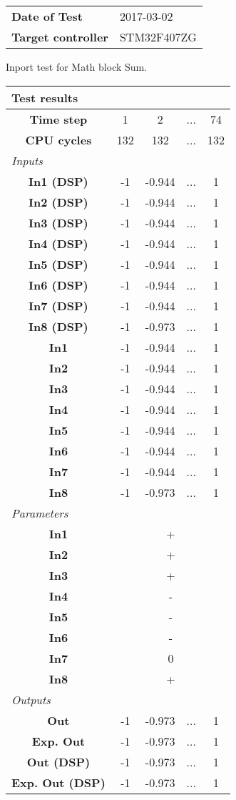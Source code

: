\begin{tabular}{l l}
\textbf{Date of Test} & 2017-03-02 \tabularnewline
\textbf{Target controller} & STM32F407ZG \tabularnewline
\end{tabular}
\vspace{1ex}
Inport test for Math block Sum.

\vspace{1em}
\begin{tabularx}{\textwidth}{|c|c|c|>{\centering\arraybackslash}X|c|}
\hline
\multicolumn{5}{|l|}{\cellcolor[gray]{0.8}\textbf{Test results}} \tabularnewline \hline
\textbf{Time step} & 1 & 2 & ... & 74 \tabularnewline \hline
\textbf{CPU cycles} & 132 & 132 & ... & 132 \tabularnewline \hline
\multicolumn{5}{|l|}{\cellcolor[gray]{0.9}\textit{Inputs}} \tabularnewline \hline
\textbf{In1 (DSP)} & -1 & -0.944 & ... & 1 \tabularnewline \hline
\textbf{In2 (DSP)} & -1 & -0.944 & ... & 1 \tabularnewline \hline
\textbf{In3 (DSP)} & -1 & -0.944 & ... & 1 \tabularnewline \hline
\textbf{In4 (DSP)} & -1 & -0.944 & ... & 1 \tabularnewline \hline
\textbf{In5 (DSP)} & -1 & -0.944 & ... & 1 \tabularnewline \hline
\textbf{In6 (DSP)} & -1 & -0.944 & ... & 1 \tabularnewline \hline
\textbf{In7 (DSP)} & -1 & -0.944 & ... & 1 \tabularnewline \hline
\textbf{In8 (DSP)} & -1 & -0.973 & ... & 1 \tabularnewline \hline
\textbf{In1} & -1 & -0.944 & ... & 1 \tabularnewline \hline
\textbf{In2} & -1 & -0.944 & ... & 1 \tabularnewline \hline
\textbf{In3} & -1 & -0.944 & ... & 1 \tabularnewline \hline
\textbf{In4} & -1 & -0.944 & ... & 1 \tabularnewline \hline
\textbf{In5} & -1 & -0.944 & ... & 1 \tabularnewline \hline
\textbf{In6} & -1 & -0.944 & ... & 1 \tabularnewline \hline
\textbf{In7} & -1 & -0.944 & ... & 1 \tabularnewline \hline
\textbf{In8} & -1 & -0.973 & ... & 1 \tabularnewline \hline
\multicolumn{5}{|l|}{\cellcolor[gray]{0.9}\textit{Parameters}} \tabularnewline \hline
\textbf{In1} & \multicolumn{4}{c|}{+} \tabularnewline \hline
\textbf{In2} & \multicolumn{4}{c|}{+} \tabularnewline \hline
\textbf{In3} & \multicolumn{4}{c|}{+} \tabularnewline \hline
\textbf{In4} & \multicolumn{4}{c|}{-} \tabularnewline \hline
\textbf{In5} & \multicolumn{4}{c|}{-} \tabularnewline \hline
\textbf{In6} & \multicolumn{4}{c|}{-} \tabularnewline \hline
\textbf{In7} & \multicolumn{4}{c|}{0} \tabularnewline \hline
\textbf{In8} & \multicolumn{4}{c|}{+} \tabularnewline \hline
\multicolumn{5}{|l|}{\cellcolor[gray]{0.9}\textit{Outputs}} \tabularnewline \hline
\textbf{Out} & -1 & -0.973 & ... & 1 \tabularnewline \hline
\textbf{Exp. Out} & -1 & -0.973 & ... & 1 \tabularnewline \hline
\textbf{Out (DSP)} & -1 & -0.973 & ... & 1 \tabularnewline \hline
\textbf{Exp. Out (DSP)} & -1 & -0.973 & ... & 1 \tabularnewline \hline
\end{tabularx}
\vspace{1ex}

